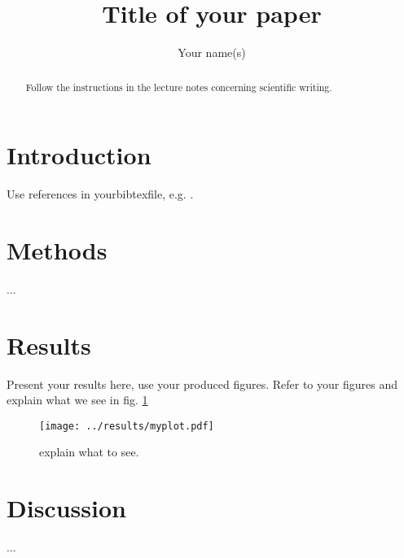 \documentclass{article}
\author{Your name(s)}
\title{Title of your paper}
\begin{document}
\maketitle

\begin{abstract}
Follow the instructions in the lecture notes concerning scientific writing. 
\end{abstract}

\section{Introduction}
Use references in yourbibtexfile, e.g. \citep{Farrell-Cheaptalk-1996}.

\section{Methods}
...

\section{Results}
Present your results here, use your produced figures. Refer to your figures and explain what we see in fig. \ref{myplot}

\begin{figure}
	\centering
	\texttt{[image: ../results/myplot.pdf]}
	\caption{explain what to see. \label{myplot}}
\end{figure}

\section{Discussion}
...


 



\end{document}
